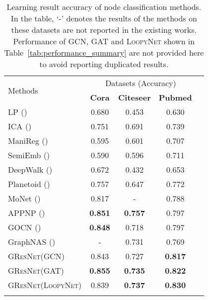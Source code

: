 \documentclass{article}
\newcommand{\gresnet}{\textsc{GResNet}}
\newcommand{\gcn}{\textsc{GCN}}
\newcommand{\gat}{\textsc{GAT}}
\newcommand{\loopy}{\textsc{LoopyNet}}
\begin{document}
\begin{table}[t]
\vspace{-35pt}
\caption{Learning result accuracy of node classification methods. In the table, `-' denotes the results of the methods on these datasets are not reported in the existing works. Performance of {\gcn}, {\gat} and {\loopy} shown in Table~\ref{tab:performance_summary} are not provided here to avoid reporting duplicated results.}\label{tab:performance_comparison}
 \vspace{-5pt}
\centering
\small
\begin{tabular}{l c c c c }
\toprule
 \multirow{2}{*}{Methods}  & \multicolumn{3}{c}{Datasets (Accuracy)} \\
 \addlinespace[0.05cm]
\cline{2-4}
\addlinespace[0.05cm]
& \textbf{Cora} & \textbf{Citeseer} & \textbf{Pubmed} \\
\addlinespace[0.05cm]
\hline
\addlinespace[0.05cm]

{LP (\cite{ZGL03}) } &0.680 &0.453 &0.630  \\
{ICA (\cite{LG03})} &0.751  &0.691  &0.739   \\
{ManiReg (\cite{BNS06})} &0.595  &0.601  &0.707   \\
{SemiEmb (\cite{WRC08})} &0.590  &0.596  &0.711  \\

\addlinespace[0.05cm]

\hline

\addlinespace[0.05cm]

{DeepWalk (\cite{PAS14})} &0.672  &0.432  &0.653   \\
{Planetoid (\cite{YCS16})} &0.757  &0.647  &0.772  \\
{MoNet (\cite{MBMRSB16})} &0.817  &-  &0.788  \\

\addlinespace[0.05cm]

\hline

\addlinespace[0.05cm]

{APPNP (\cite{KBG19})} &\textbf{0.851}  &\textbf{0.757}  &0.797   \\
{GOCN (\cite{JZTL19})} &\textbf{0.848}  &0.718  &0.797  \\
{GraphNAS (\cite{GYZZH19})} &-  &0.731  &0.769  \\

\addlinespace[0.05cm]



\bottomrule

\addlinespace[0.05cm]

{{\gresnet}({\gcn})} &{0.843}  &0.727  &\textbf{0.817}  \\
{{\gresnet}({\gat})} &\textbf{0.855}  &\textbf{0.735}  &  \textbf{0.822} \\
{{\gresnet}({\loopy})} &{0.839}  &\textbf{0.737}  &\textbf{0.830}  \\
\addlinespace[0.05cm]

\bottomrule
\end{tabular}
\vspace{-10pt}
\end{table}
\end{document}
